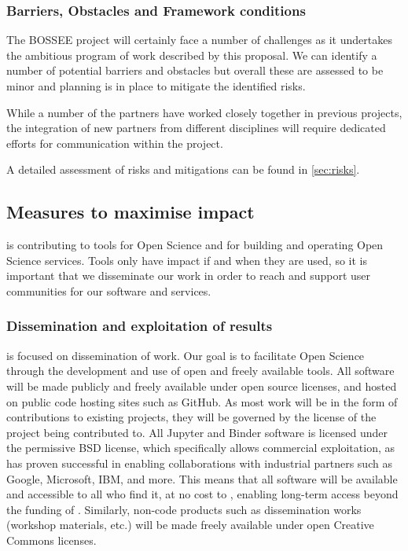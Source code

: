 \subsubsection{Barriers, Obstacles and Framework conditions}

The BOSSEE project will certainly face a number of challenges as it undertakes
the ambitious program of work described by this proposal.
We can identify a number of potential barriers and obstacles but overall
these are assessed to be minor and planning is in place to mitigate the
identified risks.

While a number of the partners have worked closely together in previous projects,
the integration of new partners from different disciplines will require
dedicated efforts for communication within the project.

A detailed assessment of risks and mitigations can be found in \ref{sec:risks}.

\subsection{Measures to maximise impact}

\TheProject is contributing to tools for Open Science and for building and operating Open Science services.
Tools only have impact if and when they are used,
so it is important that we disseminate our work
in order to reach and support user communities for our software and services.

\subsubsection{Dissemination and exploitation of results}

 is focused on dissemination of \TheProject work.
Our goal is to facilitate Open Science through the development and use of open and freely available tools.
All \TheProject software will be made publicly and freely available under open source licenses, and hosted on public code hosting sites such as GitHub.
As most \TheProject work will be in the form of
contributions to existing projects,
they will be governed by the license of the project being contributed to.
All Jupyter and Binder software is licensed under the permissive BSD license,
which specifically allows commercial exploitation,
as has proven successful in enabling collaborations with industrial partners
such as Google, Microsoft, IBM, and more.
This means that all \TheProject software will be available and accessible to all who find it,
at no cost to \TheProject,
enabling long-term access beyond the funding of \TheProject.
Similarly, non-code products such as dissemination works
(workshop materials, etc.)
will be made freely available under open Creative Commons licenses.

